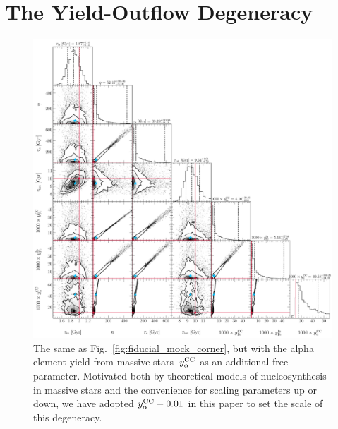 \documentclass[ms.tex]{subfiles}
\begin{document}
\renewcommand\theequation{\thesection\arabic{equation}}
\renewcommand\thefigure{\thesection\arabic{figure}}
\setcounter{equation}{0}
\setcounter{figure}{0}

\section{The Yield-Outflow Degeneracy}
\label{sec:degeneracy}

\begin{figure}
\centering
\includegraphics[scale = 0.4]{degeneracy_25k6.pdf}
\caption{
The same as Fig.~\ref{fig:fiducial_mock_corner}, but with the alpha element
yield from massive stars~$y_\alpha^\text{CC}$ as an additional free parameter.
Motivated both by theoretical models of nucleosynthesis in massive stars and
the convenience for scaling parameters up or down, we have adopted
$y_\alpha^\text{CC} - 0.01$ in this paper to set the scale of this degeneracy.
}
\label{fig:degeneracy}
\end{figure}
\end{document}
